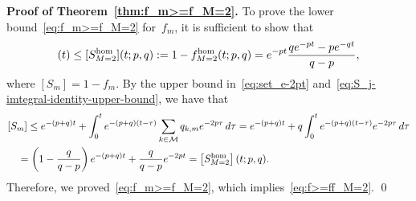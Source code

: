 \documentclass[review]{elsarticle}
\begin{document}
{\bf Proof of Theorem~\ref{thm:f_m>=f_M=2}. }
	To prove the lower bound~\eqref{eq:f_m>=f_M=2} for~$f_m$,
	it is sufficient to show that
	\begin{eqnarray*}
		[S_m](t) \leq [S_{M=2}^{\rm hom}](t;p,q) :=1-f_{M=2}^{\rm hom}(t;p,q) 
		=  e^{-pt}\frac{qe^{-pt}-pe^{-qt}}{q-p},
	\end{eqnarray*}
where $[S_m] = 1-f_m$. 
	By the upper bound in~\eqref{eq:set_e-2pt} and~\eqref{eq:S_j-imtegral-identity-upper-bound}, we have that
		\begin{equation*}
			\begin{aligned}
			 & [S_m]  \leq e^{-(p+q)t}+\int_0^te^{-(p+q)\left(t-\tau\right)}\sum_{k \in \cal M}q_{k,m}e^{-2p\tau}\, d\tau
			= e^{-(p+q)t}+q\int_0^te^{-(p+q)\left(t-\tau\right)}e^{-2p\tau}\, d\tau 
			\\
			&~~~= \left(1-\frac{q}{q-p}\right)e^{-(p+q)t}+\frac{q}{q-p}e^{-2pt} = \left[S_{M=2}^{\rm hom}\right](t;p,q).
		\end{aligned}
	\end{equation*}
	Therefore, we proved~\eqref{eq:f_m>=f_M=2}, which implies~\eqref{eq:f>=ff_M=2}. \qed
\end{document}
